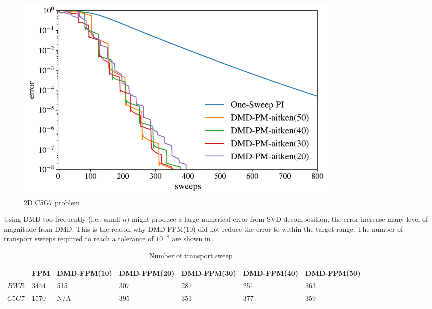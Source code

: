 \begin{figure}[htb]%
    \centering
    \includegraphics[height=4.0in]{tex/figures/dmd_ospi_semilog_c5g7.pdf}
    \caption{2D C5G7 problem}
    \label{fig:DMD-FPM_2d}
\end{figure}

Using DMD too frequently (i.e., small $n$) might produce a large numerical error from SVD decomposition, the error increase many level of magnitude from DMD.
This is the reason why DMD-FPM($10$) did not reduce the error to within the target range.
The number of transport sweeps required to reach a tolerance of $10^{-8}$ are shown in .

\begin{table}[htb]
  \centering
  \small
  \caption{Number of transport sweep}
  \begin{tabular}{lllllllll}\toprule
      & FPM  & DMD-FPM(10)& DMD-FPM(20)& DMD-FPM(30)& DMD-FPM(40)& DMD-FPM(50)
\\ \midrule
$BWR$  & 3444 & 515 & 307 & 287 & 251 & 363
\\
$C5G7$  & 1570  & N/A & 395 & 351 & 377 & 359
\\
\bottomrule
\end{tabular}
  \label{tab:widetable}
\end{table}
